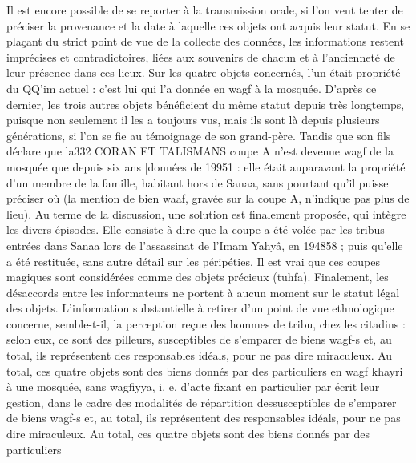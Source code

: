 Il est encore possible de se reporter à la transmission orale, si l'on veut tenter de préciser la provenance et la date à laquelle ces objets ont acquis leur statut. En se plaçant du strict point de vue de la collecte des données, les informations restent imprécises et contradictoires, liées aux souvenirs de chacun et à l'ancienneté de leur présence dans ces lieux. Sur les quatre objets concernés, l'un était propriété du QQ'im actuel : c'est lui qui l'a donnée en wagf à la mosquée. D'après ce dernier, les trois autres objets bénéficient du même statut depuis très longtemps, puisque non seulement il les a toujours vus, mais ils sont là depuis plusieurs générations, si l'on se fie au témoignage de son grand-père. Tandis que son fils déclare que la332
CORAN ET TALISMANS
coupe A n'est devenue wagf de la mosquée que depuis six ans [données de 19951 : elle était auparavant la propriété d'un membre de la famille, habitant hors de Sanaa, sans pourtant qu'il puisse préciser où (la mention de bien waaf, gravée sur la coupe A, n'indique pas plus de lieu). Au terme de la discussion, une solution est finalement proposée, qui intègre les divers épisodes. Elle consiste à dire que la coupe a été volée par les tribus entrées dans Sanaa lors de l'assassinat de l'Imam Yahyâ, en 194858 ; puis qu'elle a été restituée, sans autre détail sur les péripéties. Il est vrai que ces coupes magiques sont considérées comme des objets précieux (tuhfa).
Finalement, les désaccords entre les informateurs ne portent à aucun moment sur le statut légal des objets. L'information substantielle à retirer d'un point de vue ethnologique concerne, semble-t-il, la perception reçue des hommes de tribu, chez les citadins : selon eux, ce sont des pilleurs, susceptibles de s'emparer de biens wagf-s et, au total, ils représentent des responsables idéals, pour ne pas dire miraculeux.
Au total, ces quatre objets sont des biens donnés par des particuliers en wagf khayri à une mosquée, sans wagfiyya, i. e. d'acte fixant en particulier par écrit leur gestion, dans le cadre des modalités de répartition dessusceptibles de s'emparer de biens wagf-s et, au total, ils représentent des responsables idéals, pour ne pas dire miraculeux.
Au total, ces quatre objets sont des biens donnés par des particuliers
